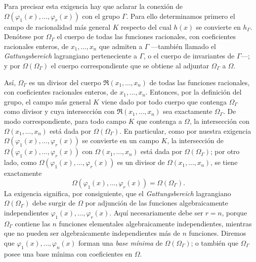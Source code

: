 \documentclass[11pt]{article}
\begin{document}
Para precisar esta exigencia hay que aclarar la conexión de $\Omega(\varphi_1(x),\ldots,\varphi_r(x))$ con el grupo $\Gamma$. Para ello determinamos primero el campo de racionalidad más general $K$ respecto del cual $h(x)$ se convierte en $h_\Gamma$. Denótese por $\Omega_\Gamma$ el cuerpo de todas las funciones racionales, con coeficientes racionales enteros, de $x_1,
\ldots,x_n$ que admiten a $\Gamma$ ---también llamado el \emph{Gattungsbereich} lagrangiano perteneciente a $\Gamma$, o el cuerpo de invariantes de $\Gamma$---; y por $\Omega(\Omega_\Gamma)$ el cuerpo correspondiente que se obtiene al adjuntar $\Omega_\Gamma$ a $\Omega$.

Así, $\Omega_\Gamma$ es un divisor del cuerpo $\mathfrak R(x_1,
\ldots,x_n)$ de todas las funciones racionales, con coeficientes racionales enteros, de $x_1,
\ldots,x_n$. Entonces, por la definición del grupo, el campo más general $K$ viene dado por todo cuerpo que contenga $\Omega_\Gamma$ como divisor y cuya intersección con $\mathfrak R(x_1,
\ldots,x_n)$ sea exactamente $\Omega_\Gamma$. De modo correspondiente, para todo campo $K$ que contenga a $\Omega$, la intersección con $\Omega(x_1,
\ldots,x_n)$ está dada por $\Omega(\Omega_\Gamma)$. En particular, como por nuestra exigencia $\Omega(\varphi_1(x),\ldots,\varphi_r(x))$ se convierte en un campo $K$, la intersección de $\Omega(\varphi_1(x),\ldots,\varphi_r(x))$ con $\Omega(x_1,
\ldots,x_n)$ está dada por $\Omega(\Omega_\Gamma)$; por otro lado, como $\Omega(\varphi_1(x),\ldots,\varphi_r(x))$ es un divisor de $\Omega(x_1,
\ldots,x_n)$, se tiene exactamente
\[
\Omega(\varphi_1(x),\ldots,\varphi_r(x))=\Omega(\Omega_\Gamma).
\]
La exigencia significa, por consiguiente, que el \emph{Gattungsbereich} lagrangiano $\Omega(\Omega_\Gamma)$ debe surgir de $\Omega$ por adjunción de las funciones algebraicamente independientes $\varphi_1(x),\ldots,\varphi_r(x)$. Aquí necesariamente debe ser $r=n$, porque $\Omega_\Gamma$ contiene las $n$ funciones elementales algebraicamente independientes, mientras que no pueden ser algebraicamente independientes más de $n$ funciones. Diremos que $\varphi_1(x),\ldots,\varphi_n(x)$ forman una \emph{base mínima} de $\Omega(\Omega_\Gamma)$; o también que $\Omega_\Gamma$ posee una base mínima con coeficientes en $\Omega$.
\end{document}
